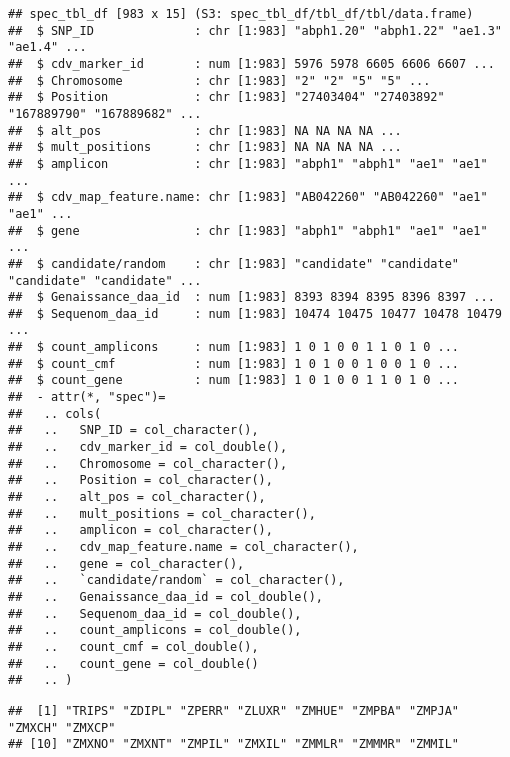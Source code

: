 \documentclass[
]{article}
\newenvironment{Shaded}{\begin{snugshade}}{\end{snugshade}}
\newcommand{\FunctionTok}[1]{\textcolor[rgb]{0.00,0.00,0.00}{#1}}
\newcommand{\NormalTok}[1]{#1}
\newcommand{\SpecialCharTok}[1]{\textcolor[rgb]{0.00,0.00,0.00}{#1}}
\begin{document}
\begin{verbatim}
## spec_tbl_df [983 x 15] (S3: spec_tbl_df/tbl_df/tbl/data.frame)
##  $ SNP_ID              : chr [1:983] "abph1.20" "abph1.22" "ae1.3" "ae1.4" ...
##  $ cdv_marker_id       : num [1:983] 5976 5978 6605 6606 6607 ...
##  $ Chromosome          : chr [1:983] "2" "2" "5" "5" ...
##  $ Position            : chr [1:983] "27403404" "27403892" "167889790" "167889682" ...
##  $ alt_pos             : chr [1:983] NA NA NA NA ...
##  $ mult_positions      : chr [1:983] NA NA NA NA ...
##  $ amplicon            : chr [1:983] "abph1" "abph1" "ae1" "ae1" ...
##  $ cdv_map_feature.name: chr [1:983] "AB042260" "AB042260" "ae1" "ae1" ...
##  $ gene                : chr [1:983] "abph1" "abph1" "ae1" "ae1" ...
##  $ candidate/random    : chr [1:983] "candidate" "candidate" "candidate" "candidate" ...
##  $ Genaissance_daa_id  : num [1:983] 8393 8394 8395 8396 8397 ...
##  $ Sequenom_daa_id     : num [1:983] 10474 10475 10477 10478 10479 ...
##  $ count_amplicons     : num [1:983] 1 0 1 0 0 1 1 0 1 0 ...
##  $ count_cmf           : num [1:983] 1 0 1 0 0 1 0 0 1 0 ...
##  $ count_gene          : num [1:983] 1 0 1 0 0 1 1 0 1 0 ...
##  - attr(*, "spec")=
##   .. cols(
##   ..   SNP_ID = col_character(),
##   ..   cdv_marker_id = col_double(),
##   ..   Chromosome = col_character(),
##   ..   Position = col_character(),
##   ..   alt_pos = col_character(),
##   ..   mult_positions = col_character(),
##   ..   amplicon = col_character(),
##   ..   cdv_map_feature.name = col_character(),
##   ..   gene = col_character(),
##   ..   `candidate/random` = col_character(),
##   ..   Genaissance_daa_id = col_double(),
##   ..   Sequenom_daa_id = col_double(),
##   ..   count_amplicons = col_double(),
##   ..   count_cmf = col_double(),
##   ..   count_gene = col_double()
##   .. )
\end{verbatim}

\begin{Shaded}
\end{Shaded}

\begin{verbatim}
##  [1] "TRIPS" "ZDIPL" "ZPERR" "ZLUXR" "ZMHUE" "ZMPBA" "ZMPJA" "ZMXCH" "ZMXCP"
## [10] "ZMXNO" "ZMXNT" "ZMPIL" "ZMXIL" "ZMMLR" "ZMMMR" "ZMMIL"
\end{verbatim}

\begin{Shaded}
\end{Shaded}
\end{document}
